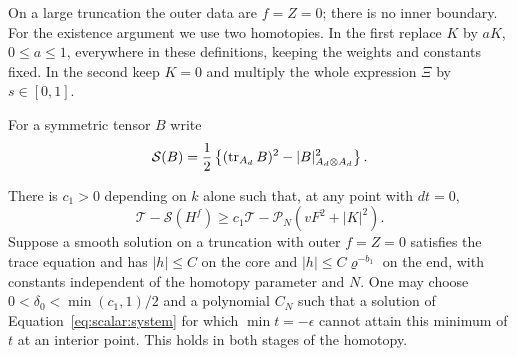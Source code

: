 On a large truncation the outer data are $f=Z=0$; there is no inner
boundary.  For the existence argument we use two homotopies.  In the
first replace $K$ by $aK$, $0\leq a\leq1$, everywhere in these
definitions, keeping the weights and constants fixed.  In the second
keep $K=0$ and multiply the whole expression $\Xi$ by $s\in[0,1]$.

For a symmetric tensor $B$ write
\[
 \mathcal S(B)=\frac12\left\{(\operatorname{tr}_{A_d}B)^2
                                      -|B|_{A_d\otimes A_d}^2\right\}.
\]

\begin{lemma}\label{lem:scalar:floor}
There is $c_1>0$ depending on $k$ alone such that, at any point with
$dt=0$,
\begin{equation}
 \mathcal T-\mathcal S(H^f)
       \geq c_1\mathcal T-\mathcal P_N(vF^2+|K|^2).
 \label{eq:scalar:floor-algebra}
\end{equation}
Suppose a smooth solution on a truncation with outer $f=Z=0$
satisfies the trace equation and has $|h|\leq C$ on
the core and $|h|\leq C\varrho^{-b_1}$ on the end, with constants
independent of the homotopy parameter and $N$.  One may choose
$0<\delta_0<\min(c_1,1)/2$ and a polynomial $C_N$ such that a solution
of Equation~\eqref{eq:scalar:system} for which $\min t=-\epsilon$
cannot attain this minimum of $t$ at an interior point.  This holds in
both stages of the homotopy.
\end{lemma}

